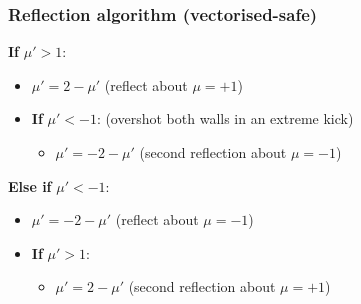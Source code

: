 \subsubsection{ Reflection algorithm (vectorised-safe)}

\begin{tcolorbox}[colframe=black, colback=white, title=Pitch-Angle Reflection at Boundaries]
\textbf{If} \( \mu' > 1 \):
\begin{itemize}
    \item \( \mu' = 2 - \mu' \) \quad (reflect about \( \mu = +1 \))
    \item \textbf{If} \( \mu' < -1 \): \quad (overshot both walls in an extreme kick)
    \begin{itemize}
        \item \( \mu' = -2 - \mu' \) \quad (second reflection about \( \mu = -1 \))
    \end{itemize}
\end{itemize}
\textbf{Else if} \( \mu' < -1 \):
\begin{itemize}
    \item \( \mu' = -2 - \mu' \) \quad (reflect about \( \mu = -1 \))
    \item \textbf{If} \( \mu' > 1 \):
    \begin{itemize}
        \item \( \mu' = 2 - \mu' \) \quad (second reflection about \( \mu = +1 \))
    \end{itemize}
\end{itemize}
\end{tcolorbox}

